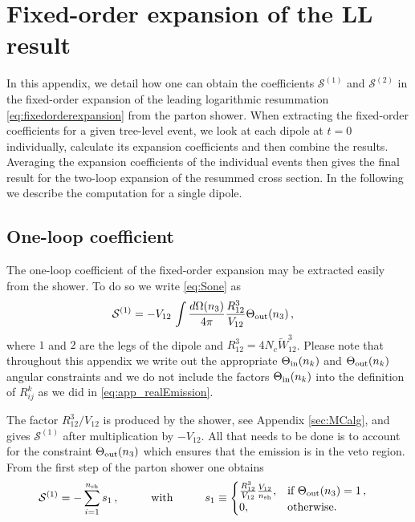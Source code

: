 \documentclass[11pt,a4paper]{article}
\begin{document}
\section{Fixed-order expansion of the LL result \label{sec:FOofLL}}
In this appendix, we detail how one can obtain the coefficients $\mathcal{S}^{(1)}$ and $\mathcal{S}^{(2)}$ in the fixed-order expansion of the leading logarithmic resummation \eqref{eq:fixedorderexpansion} from the parton shower. When extracting the fixed-order coefficients for a given tree-level event, we look at each dipole at $t=0$ individually, calculate its expansion coefficients and then combine the results. Averaging the expansion coefficients of the individual events then gives the final result for the two-loop expansion of the resummed cross section. In the following we describe the computation for a single dipole.

\subsection{One-loop coefficient}
The one-loop coefficient of the fixed-order expansion may be extracted easily from the shower. To do so we write \eqref{eq:Sone}  as 
\begin{align}\label{eq:app_s1rewrite}
\mathcal{S}^{(1)} &= - V_{12} \,\int \frac{d\Omega (n_3)}{4\pi}  \frac{R_{12}^{3}}{V_{12}} \Theta_{\rm out}(n_3)\,,
\end{align}
where $1$ and $2$ are the legs of the dipole and $R_{12}^{3} = 4N_c \widetilde{W}_{12}^3$. Please note that throughout this appendix we write out the appropriate $\Theta_{\rm in}(n_k)$ and $\Theta_{\rm out}(n_k)$ angular constraints and we do not include the factors $\Theta_{\rm in}(n_k)$ into the definition of $R_{ij}^{k}$ as we did in \eqref{eq:app_realEmission}.

The factor ${R_{12}^{3}}/{V_{12}}$ is produced by the shower, see Appendix \ref{sec:MCalg}, and gives $\mathcal{S}^{(1)}$ after multiplication by $-V_{12}$. All that needs to be done is to account for the constraint $\Theta_{\rm out}(n_3)$ which ensures that the emission is in the veto region. From the first step of the parton shower one obtains
\begin{align}
\mathcal{S}^{(1)} &= -\sum_{i=1}^{n_{\rm{sh}}} s_1\,,\hspace{1cm}\text{with}\hspace{1cm} s_1\equiv \begin{cases}
\frac{R_{12}^{3}}{V_{12}}\frac{V_{12}}{n_{\rm sh}},& \text{if } \Theta_{\rm out}(n_3)=1\,,\\
0,              & \text{otherwise.}
\end{cases}
\end{align}
\end{document}
